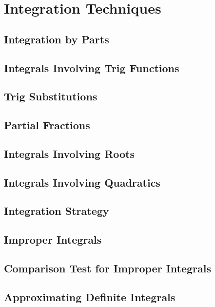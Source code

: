 \documentclass[../satmath.tex]{subfiles}
\begin{document}
\chapter{Integration Techniques}
\section{Integration by Parts}
\section{Integrals Involving Trig Functions}
\section{Trig Substitutions}
\section{Partial Fractions}
\section{Integrals Involving Roots}
\section{Integrals Involving Quadratics}
\section{Integration Strategy}
\section{Improper Integrals}
\section{Comparison Test for Improper Integrals}
\section{Approximating Definite Integrals}
\end{document}
